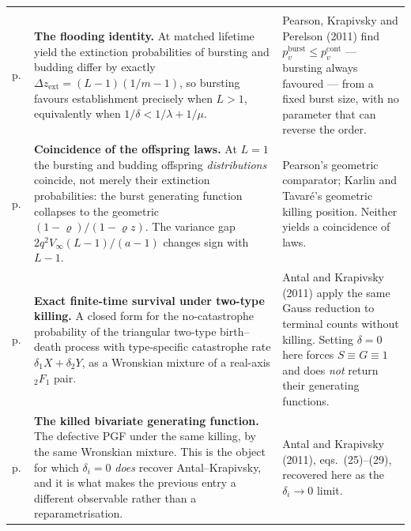 \vspace{0.35\baselineskip}
{\small
\begin{xltabular}{\linewidth}{@{}>{\raggedright\arraybackslash}p{20mm}O>{\raggedright\arraybackslash}p{40mm}@{}}
\toprule
{} &  &  \\
\midrule
\endfirsthead
\toprule
{} &  &  \\
\midrule
\endhead
\bottomrule
\endlastfoot

\newline p.\,\pageref{p:thm:flood} &
\textbf{The flooding identity.} At matched lifetime yield the extinction probabilities of
bursting and budding differ by exactly $\Delta z_{\mathrm{ext}}=(L-1)(1/m-1)$, so bursting
favours establishment precisely when $L>1$, equivalently when $1/\delta<1/\lambda+1/\mu$. &
Pearson, Krapivsky and Perelson (2011) find $p_v^{\mathrm{burst}}\le p_v^{\mathrm{cont}}$ ---
bursting always favoured --- from a fixed burst size, with no parameter that can reverse the
order. \\
\addlinespace[5pt]

\newline p.\,\pageref{p:prop:L1} &
\textbf{Coincidence of the offspring laws.} At $L=1$ the bursting and budding offspring
\emph{distributions} coincide, not merely their extinction probabilities: the burst
generating function collapses to the geometric $(1-\varrho)/(1-\varrho z)$. The variance
gap $2q^{2}V_\infty(L-1)/(a-1)$ changes sign with $L-1$. &
Pearson's geometric comparator; Karlin and Tavar\'e's geometric killing position. Neither
yields a coincidence of laws. \\
\addlinespace[5pt]

\newline p.\,\pageref{tt:thm:main} &
\textbf{Exact finite-time survival under two-type killing.} A closed form for the
no-catastrophe probability of the triangular two-type birth--death process with
type-specific catastrophe rate $\delta_1X+\delta_2Y$, as a Wronskian mixture of a
real-axis ${}_2F_1$ pair. &
Antal and Krapivsky (2011) apply the same Gauss reduction to terminal counts without
killing. Setting $\delta=0$ here forces $S\equiv G\equiv1$ and does \emph{not} return
their generating functions. \\
\addlinespace[5pt]

\newline p.\,\pageref{eq:pgf-F1-solution} &
\textbf{The killed bivariate generating function.} The defective PGF under the same
killing, by the same Wronskian mixture. This is the object for which $\delta_i=0$
\emph{does} recover Antal--Krapivsky, and it is what makes the previous entry a different
observable rather than a reparametrisation. &
Antal and Krapivsky (2011), eqs.\ (25)--(29), recovered here as the $\delta_i\to0$ limit. \\
\end{xltabular}\par}


